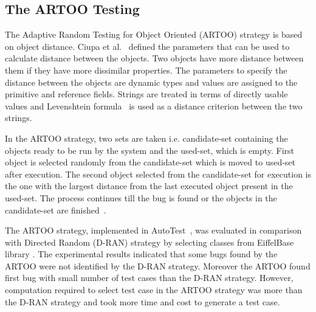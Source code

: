 \subsection{The ARTOO Testing}
The Adaptive Random Testing for Object Oriented (ARTOO) strategy is based on object distance. Ciupa et al.~\cite{Ciupa2006} defined the parameters that can be used to calculate distance between the objects. Two objects have more distance between them if they have more dissimilar properties. The parameters to specify the distance between the objects are dynamic types and values are assigned to the primitive and reference fields. Strings are treated in terms of directly usable values and Levenshtein formula~\cite{Levenshtein1966} is used as a distance criterion between the two strings.

In the ARTOO strategy, two sets are taken i.e. candidate-set containing the objects ready to be run by the system and the used-set, which is empty. First object is selected randomly from the candidate-set which is moved to used-set after execution. The second object selected from the candidate-set for execution is the one with the largest distance from the last executed object present in the used-set. The process continues till the bug is found or the objects in the candidate-set are finished~\cite{Ciupa2006}.

The ARTOO strategy, implemented in AutoTest~\cite{Ciupa2008a}, was evaluated in comparison with Directed Random (D-RAN) strategy by selecting classes from EiffelBase library \cite{meyer1987eiffel}. The experimental results indicated that some bugs found by the ARTOO were not identified by the D-RAN strategy. Moreover the ARTOO found first bug with small number of test cases than the D-RAN strategy. However, computation required to select test case in the ARTOO strategy was more than the D-RAN strategy and took more time and cost to generate a test case.

